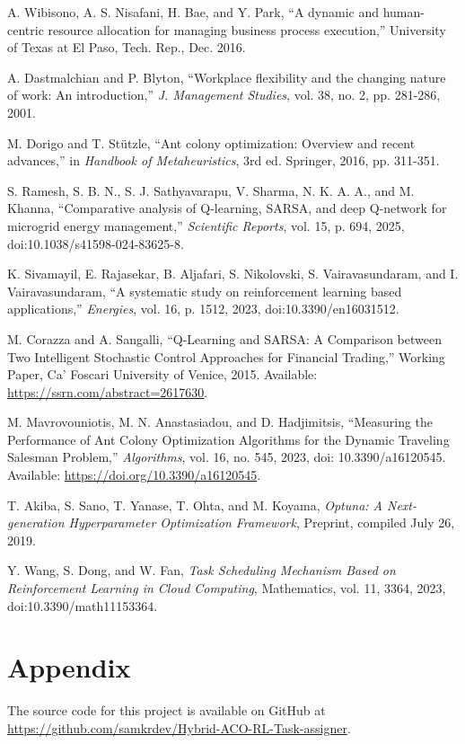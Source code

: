 \documentclass[12pt]{article}
\begin{document}
\begin{thebibliography}{99}
		 A. Wibisono, A. S. Nisafani, H. Bae, and Y. Park, ``A dynamic
		and human-centric resource allocation for managing business process execution,''
		University of Texas at El Paso, Tech. Rep., Dec. 2016.
		
		 A. Dastmalchian and P. Blyton, ``Workplace flexibility
		and the changing nature of work: An introduction,'' \textit{J. Management Studies},
		vol. 38, no. 2, pp. 281-286, 2001.
		
		 M. Dorigo and T. Stützle, ``Ant colony optimization:
		Overview and recent advances,'' in \textit{Handbook of Metaheuristics}, 3rd
		ed. Springer, 2016, pp. 311-351.
		
		 S. Ramesh, S. B. N., S. J. Sathyavarapu, V. Sharma, N. K. A. A., and M. Khanna, ``Comparative analysis of Q-learning, SARSA, and deep Q-network for microgrid energy management,'' \textit{Scientific Reports}, vol. 15, p. 694, 2025, doi:10.1038/s41598-024-83625-8.
		
		 K. Sivamayil, E. Rajasekar, B. Aljafari, S. Nikolovski, S. Vairavasundaram, and I. Vairavasundaram, ``A systematic study on reinforcement learning based applications,'' \textit{Energies}, vol. 16, p. 1512, 2023, doi:10.3390/en16031512.
		
		M. Corazza and A. Sangalli, ``Q-Learning and SARSA: A Comparison between Two Intelligent Stochastic Control Approaches for Financial Trading,'' Working Paper, Ca’ Foscari University of Venice, 2015. Available: \url{https://ssrn.com/abstract=2617630}.
		
		M. Mavrovouniotis, M. N. Anastasiadou, and D. Hadjimitsis, ``Measuring the Performance of Ant Colony Optimization Algorithms for the Dynamic Traveling Salesman Problem,'' \textit{Algorithms}, vol. 16, no. 545, 2023, doi: 10.3390/a16120545. Available: \url{https://doi.org/10.3390/a16120545}.
		
		T. Akiba, S. Sano, T. Yanase, T. Ohta, and M. Koyama, \emph{Optuna: A Next-generation Hyperparameter Optimization Framework}, Preprint, compiled July 26, 2019.
		
		
		Y. Wang, S. Dong, and W. Fan, \emph{Task Scheduling Mechanism Based on Reinforcement Learning in Cloud Computing}, Mathematics, vol. 11, 3364, 2023, doi:10.3390/math11153364.
		
	\end{thebibliography}
	
	\section{\label{sec:appendix}Appendix}
	The source code for this project is available on GitHub at \url{https://github.com/samkrdev/Hybrid-ACO-RL-Task-assigner}.
	
\end{document}
